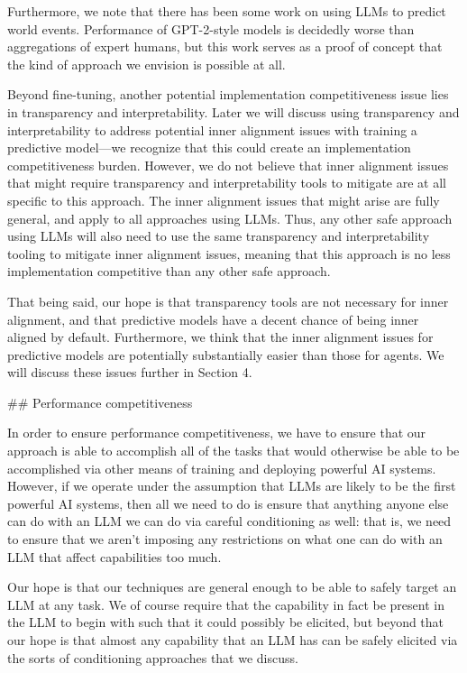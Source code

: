 {Furthermore, we note that there has been some work\cite{TODO: cite https://arxiv.org/pdf/2206.15474.pdf} on using LLMs to predict world events. Performance of GPT-2-style models is decidedly worse than aggregations of expert humans, but this work serves as a proof of concept that the kind of approach we envision is possible at all.

Beyond fine-tuning, another potential implementation competitiveness issue lies in transparency and interpretability. Later we will discuss using transparency and interpretability to address potential inner alignment issues with training a predictive model---we recognize that this could create an implementation competitiveness burden. However, we do not believe that inner alignment issues that might require transparency and interpretability tools to mitigate are at all specific to this approach. The inner alignment issues that might arise are fully general, and apply to all approaches using LLMs. Thus, any other safe approach using LLMs will also need to use the same transparency and interpretability tooling to mitigate inner alignment issues, meaning that this approach is no less implementation competitive than any other safe approach.

That being said, our hope is that transparency tools are not necessary for inner alignment, and that predictive models have a decent chance of being inner aligned by default. Furthermore, we think that the inner alignment issues for predictive models are potentially substantially easier than those for agents. We will discuss these issues further in Section 4\cite{TODO: cite TODO}.


## Performance competitiveness

In order to ensure performance competitiveness, we have to ensure that our approach is able to accomplish all of the tasks that would otherwise be able to be accomplished via other means of training and deploying powerful AI systems. However, if we operate under the assumption that LLMs are likely to be the first powerful AI systems, then all we need to do is ensure that anything anyone else can do with an LLM we can do via careful conditioning as well: that is, we need to ensure that we aren't imposing any restrictions on what one can do with an LLM that affect capabilities too much.

Our hope is that our techniques are general enough to be able to safely target an LLM at any task. We of course require that the capability in fact be present in the LLM to begin with such that it could possibly be elicited, but beyond that our hope is that almost any capability that an LLM has can be safely elicited via the sorts of conditioning approaches that we discuss.


}
